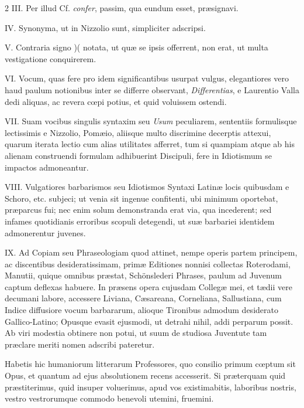 \begin{multicols}{2}
III. Per illud Cf. \textit{confer}, passim, qua eundum esset, præsignavi.

IV. Synonyma, ut in Nizzolio sunt, simpliciter adscripsi.

V. Contraria signo )( notata, ut quæ se ipsis offerrent, non erat, ut multa vestigatione conquirerem.

VI. Vocum, quas fere pro idem significantibus usurpat vulgus, elegantiores vero haud paulum notionibus inter se differre observant, \textit{Differentias}, e Laurentio Valla dedi aliquas, ac revera cœpi potius, et quid voluissem ostendi.

VII. Suam vocibus singulis syntaxim seu \textit{Usum} peculiarem, sententiis formulisque lectissimis e Nizzolio, Pomæio, aliisque multo discrimine decerptis attexui, quarum iterata lectio cum alias utilitates afferret, tum si quampiam atque ab his alienam construendi formulam adhibuerint Discipuli, fere in Idiotismum se impactos admoneantur.

VIII. Vulgatiores barbarismos seu Idiotismos Syntaxi Latinæ locis quibusdam e Schoro, etc. subjeci; ut venia sit ingenue confitenti, ubi minimum oportebat, præparcus fui; nec enim solum demonstranda erat via, qua incederent; sed infames quotidianis erroribus scopuli detegendi, ut suæ barbariei identidem admonerentur juvenes.

IX. Ad Copiam seu Phraseologiam quod attinet, nempe operis partem principem, ac discentibus desideratissimam, primæ Editiones nonnisi collectas Roterodami, Manutii, quique omnibus præstat, Schönslederi Phrases, paulum ad Juvenum captum deflexas habuere. In præsens opera cujusdam Collegæ mei, et tædii vere decumani labore, accessere Liviana, Cæsareana, Corneliana, Sallustiana, cum Indice diffusiore vocum barbararum, alioque Tironibus admodum desiderato Gallico-Latino; Opusque evasit ejusmodi, ut detrahi nihil, addi perparum possit. Ab viri modestia obtinere non potui, ut suum de studiosa Juventute tam præclare meriti nomen adscribi pateretur.

Habetis hic humaniorum litterarum Professores, quo consilio primum cœptum sit Opus, et quantum ad ejus absolutionem recens accesserit. Si præterquam quid præstiterimus, quid insuper voluerimus, apud vos existimabitis, laboribus nostris, vestro vestrorumque commodo benevoli utemini, fruemini.

\end{multicols}
